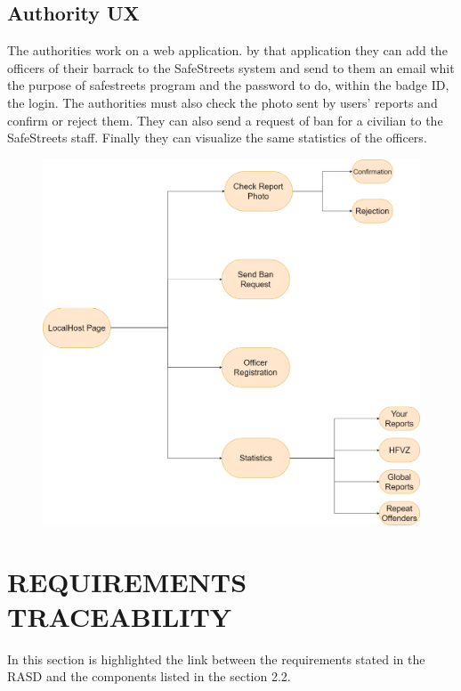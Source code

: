 \documentclass[12pt,a4paper]{article}
\begin{document}
\subsection{Authority UX}
The authorities work on a web application. by that application they can add the officers of their barrack to the SafeStreets system and send to them an email whit the purpose of safestreets program and the password to do, within the badge ID, the login. The authorities must also check the photo sent by users' reports and confirm or reject them. They can also send  a request of ban for a civilian to the SafeStreets staff. Finally they can visualize the same statistics of the officers.
\begin{figure}[H]
		\centering
			\includegraphics[width=1.0\linewidth]{Images/UX/AuthorityUX}
\end{figure}
\newpage
\section{REQUIREMENTS TRACEABILITY}
In this section is highlighted the link between the requirements stated in the RASD and the components listed in the section 2.2.\\\\
\end{document}
